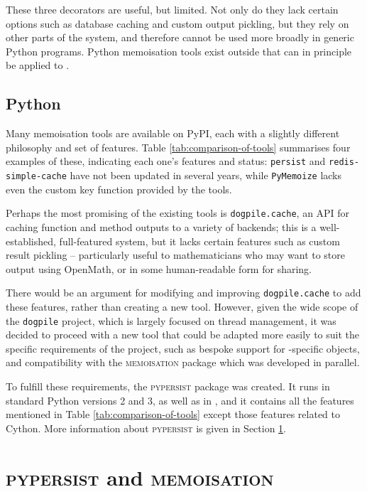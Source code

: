 \documentclass{deliverablereport}
\newcommand{\pypersist}{\textsc{pypersist}}
\newcommand{\Memoisation}{\textsc{memoisation}}
\begin{document}
These three decorators are useful, but limited.  Not only do they lack certain
options such as database caching and custom output pickling, but they rely on
other parts of the \Sage system, and therefore cannot be used more broadly in
generic Python programs.  Python memoisation tools exist outside \Sage that can
in principle be applied to \Sage.

\subsection{Python}
Many memoisation tools are available on PyPI, each with a slightly different
philosophy and set of features.  Table \ref{tab:comparison-of-tools} summarises
four examples of these, indicating each one's features and status:
\texttt{persist} and \texttt{redis-simple-cache} have not been updated in
several years, while \texttt{PyMemoize} lacks even the custom key function
provided by the \Sage tools.

Perhaps the most promising of the existing tools is \texttt{dogpile.cache}, an
API for caching function and method outputs to a variety of backends; this is a
well-established, full-featured system, but it lacks certain features such as
custom result pickling -- particularly useful to mathematicians who may want to
store output using OpenMath, or in some human-readable form for sharing.

There would be an argument for modifying and improving \texttt{dogpile.cache} to
add these features, rather than creating a new tool.  However, given the wide
scope of the \texttt{dogpile} project, which is largely focused on thread
management, it was decided to proceed with a new tool that could be adapted more
easily to suit the specific requirements of the project, such as bespoke support
for \Sage-specific objects, and compatibility with the \GAP \Memoisation{} package
which was developed in parallel.

To fulfill these requirements, the \pypersist{} package was created.  It runs in
standard Python versions 2 and 3, as well as in \Sage, and it contains all the features mentioned in Table
\ref{tab:comparison-of-tools} except those features related to Cython.  More
information about \pypersist{} is given in Section \ref{sec:pypersist}.

\section{\pypersist{} and \Memoisation{}}
\label{sec:pypersist}
\end{document}

